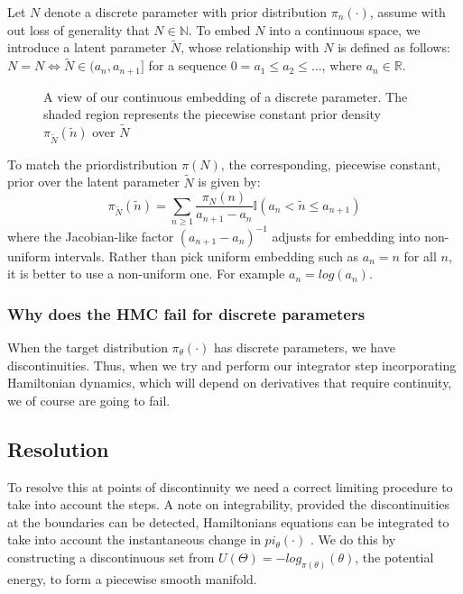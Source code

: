 \documentclass[]{report}
\begin{document}
Let $N$ denote a discrete parameter with prior distribution $\pi_{n}(\cdot)$, assume with out loss of generality that $N \in \mathbb{N}$. To embed $N$ into a continuous space, we introduce
a latent parameter $\tilde{N}$, whose relationship with $N$ is defined as follows: $N = N \iff \tilde{N}\in(a_{n}, a_{n+1}] $ for a sequence $0 = a_{1} \leq a_{2} \leq \ldots$, where $a_{n} \in \mathbb{R}$. \\
\begin{figure}[h!]
	\centering
{}
\caption{A view of our continuous embedding of a discrete parameter. The shaded region represents the piecewise constant prior density $\pi_{\tilde{N}}(\tilde{n})$ over $\tilde{N}$}\label{fig:contembedding}
\end{figure}
To match the priordistribution $\pi(N)$, the corresponding, piecewise constant, prior over the latent parameter $\tilde{N}$ is given by: \begin{equation}
\pi_{\tilde{N}}(\tilde{n}) = \sum_{n \geq 1} \frac{\pi_{N}(n)}{a_{n+1} - a_{n}} \mathbb{I}(a_{n} < \tilde{n} \leq a_{n+1}) 
\end{equation}
where the Jacobian-like factor $(a_{n+1} - a_{n})^{-1}$ adjusts for embedding into non-uniform intervals. Rather than pick uniform embedding such as $a_{n} = n$ for all $n$, it is better to use a non-uniform one. For example $a_{n} = log(a_{n})$.

\subsubsection{Why does the HMC fail for discrete parameters}
When the target distribution $\pi_{\theta}(\cdot)$ has discrete parameters, we have discontinuities. Thus, when we try and perform our integrator step incorporating Hamiltonian dynamics, 
which will depend on derivatives that require continuity, we of course are going to fail.

\subsection{Resolution}
To resolve this at points of discontinuity we need a correct limiting procedure to take into account the steps. A note on integrability, provided the discontinuities at the boundaries can be detected, Hamiltonians equations can be integrated to take into account the instantaneous change in $pi_{\theta}(\cdot)$ . We do this by constructing a discontinuous set from $U(\Theta) = -log_{\pi(\theta)}(\theta)$, the potential energy, to form a piecewise smooth manifold.\\
\end{document}
